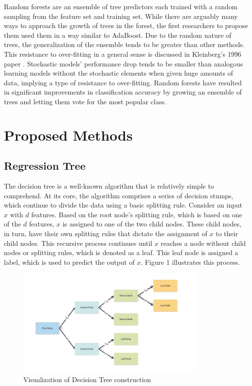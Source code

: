 \documentclass{article}
\begin{document}
Random forests are an ensemble of tree predictors each trained with a random sampling from the feature set and training set. While there are arguably many ways to approach the growth of trees in the forest, the first researchers to propose them used them in a way similar to AdaBoost.  Due to the random nature of trees, the generalization of the ensemble tends to be greater than other methods. This resistance to over-fitting in a general sense is discussed in Kleinberg's 1996 paper \cite{Kleinberg}. Stochastic models' performance drop tends to be smaller than analogous learning models without the stochastic elements when given huge amounts of data, implying a type of resistance to over-fitting. Random forests have resulted in significant improvements in classification accuracy by growing an ensemble of trees and letting them vote for the most popular class.

\section{Proposed Methods}
\label{headings}

\subsection{Regression Tree}

The decision tree is a well-known algorithm that is relatively simple to comprehend. At its core, the algorithm comprises a series of decision stumps, which continue to divide the data using a basic splitting rule. Consider an input \(x\) with \(d\) features. Based on the root node's splitting rule, which is based on one of the \(d\) features, \(x\) is assigned to one of the two child nodes. These child nodes, in turn, have their own splitting rules that dictate the assignment of \(x\) to their child nodes. This recursive process continues until \(x\) reaches a node without child nodes or splitting rules, which is denoted as a leaf. This leaf node is assigned a label, which is used to predict the output of \(x\). Figure 1 illustrates this process.

\begin{figure}[h]
\caption{Visualization of Decision Tree construction}
\centering
\includegraphics[width=0.85\textwidth]{Fig1}
\end{figure}
\end{document}
